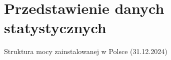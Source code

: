 \section{Przedstawienie danych statystycznych}

\begin{frame}{Struktura mocy zainstalowanej w Polsce (31.12.2024)}
    \begin{columns}[T]
        \begin{column}{0.40\textwidth}
        \end{column}
        
        \begin{column}{0.52\textwidth}
        \end{column}
    \end{columns}

\end{frame}

